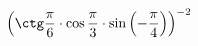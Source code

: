 \begin{ex}[type=calculate_expression]
	\begin{condition}
		\( \left( \ctg\dfrac{\pi}{6} \cdot \cos\dfrac{\pi}{3} \cdot \sin\left( -\dfrac{\pi}{4} \right) \right)^{-2} \)
	\end{condition}
\end{ex}